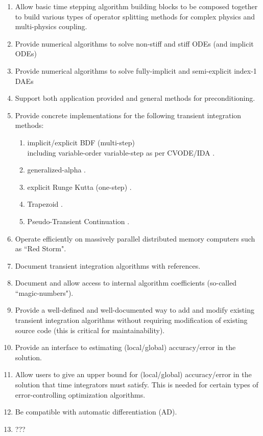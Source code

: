 \documentclass[pdf,ps2pdf,11pt]{SANDreport}
\begin{document}
\begin{enumerate}
{}\item Allow basic time stepping algorithm building blocks to be composed
together to build various types of operator splitting methods for complex
physics and multi-physics coupling.

{}\item Provide numerical algorithms to solve non-stiff and stiff ODEs (and
implicit ODEs)

{}\item Provide numerical algorithms to solve fully-implicit and semi-explicit
index-1 DAEs

{}\item Support both application provided and general methods for
preconditioning.

{}\item Provide concrete implementations for the following transient integration methods:
  \begin{enumerate}
  {}\item implicit/explicit BDF (multi-step) \\
        including variable-order variable-step as per CVODE/IDA \cite{CVODE,IDA}.
  {}\item generalized-alpha \cite{GeneralizedAlpha}.
  {}\item explicit Runge Kutta (one-step) \cite{ERKMethods}.
  {}\item Trapezoid \cite{Trapezoid}.
  {}\item Pseudo-Transient Continuation \cite{PTC,PTCDAE}.
  \end{enumerate}

{}\item Operate efficiently on massively parallel distributed memory
computers such as ``Red Storm".

{}\item Document transient integration algorithms with references.

{}\item Document and allow access to internal algorithm coefficients
(so-called ``magic-numbers").

{}\item Provide a well-defined and well-documented way to add and modify
existing transient integration algorithms without requiring modification of
existing source code (this is critical for maintainability).

{}\item Provide an interface to estimating (local/global)
accuracy/error in the solution.

{}\item Allow users to give an upper bound for (local/global) accuracy/error
in the solution that time integrators must satisfy.  This is needed for
certain types of error-controlling optimization algorithms.

{}\item Be compatible with automatic differentiation (AD).

{}\item ???

\end{enumerate}
\end{document}
